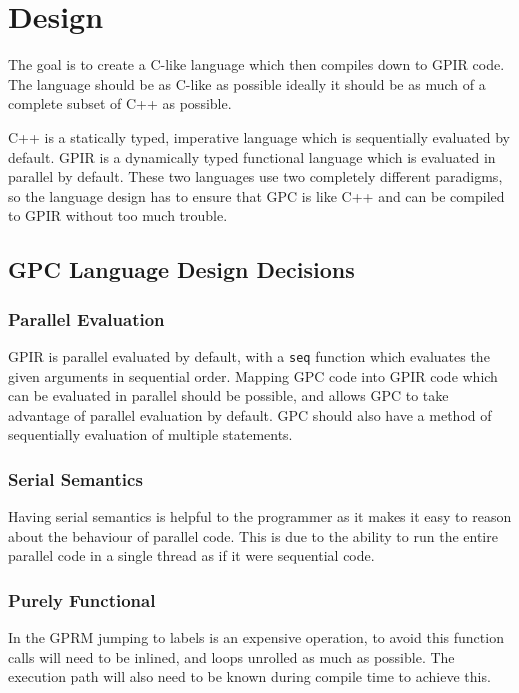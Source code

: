 \chapter{Design}

The goal is to create a C-like language which then compiles down to GPIR code.
The language should be as C-like as possible ideally it should be as much
of a complete subset of C++ as possible.

C++ is a statically typed, imperative language which is sequentially evaluated by default.
GPIR is a dynamically typed functional language which is evaluated in parallel by default.
These two languages use two completely different paradigms, so the language design has to 
ensure that GPC is like C++ and can be compiled to GPIR without too much trouble.

\section{GPC Language Design Decisions}
\label{sec:Lang}

\subsection{Parallel Evaluation}
GPIR is parallel evaluated by default, with a \texttt{seq} function which
evaluates the given arguments in sequential order. Mapping GPC code into
GPIR code which can be evaluated in parallel should be possible, and allows
GPC to take advantage of parallel evaluation by default. GPC should also
have a method of sequentially evaluation of multiple statements.


\subsection{Serial Semantics}
Having serial semantics is helpful to the programmer as it makes
it easy to reason about the behaviour of parallel code.
This is due to the ability to run the entire parallel code in a single
thread as if it were sequential code. 

\subsection{Purely Functional}

In the GPRM jumping to labels is an expensive operation, to avoid
this function calls will need to be inlined, and loops unrolled 
as much as possible. The execution path will also need to be known 
during compile time to achieve this. 

